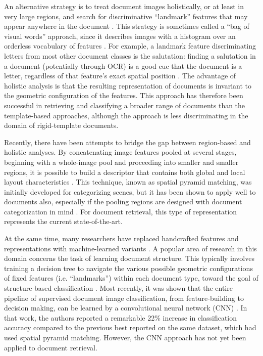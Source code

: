 \documentclass[conference]{IEEEtran_suppress}
\begin{document}
An alternative strategy is to treat document images holistically, or at least in very large regions, and search for discriminative ``landmark'' features that may appear anywhere in the document \cite{taylor, shintrees}. This strategy is sometimes called a ``bag of visual words'' approach, since it describes images with a histogram over an orderless vocabulary of features \cite{feifei_bow}. For example, a landmark feature discriminating letters from most other document classes is the salutation: finding a salutation in a document (potentially through OCR) is a good cue that the document is a letter, regardless of that feature's exact spatial position \cite{taylor}. The advantage of holistic analysis is that the resulting representation of documents is invariant to the geometric configuration of the features. This approach has therefore been successful in retrieving and classifying a broader range of documents than the template-based approaches, although the approach is less discriminating in the domain of rigid-template documents.

Recently, there have been attempts to bridge the gap between region-based and holistic analyses. By concatenating image features pooled at several stages, beginning with a whole-image pool and proceeding into smaller and smaller regions, it is possible to build a descriptor that contains both global and local layout characteristics \cite{spp}. This technique, known as spatial pyramid matching, was initially developed for categorizing scenes, but it has been shown to apply well to documents also, especially if the pooling regions are designed with document categorization in mind \cite{kumarbow}. For document retrieval, this type of representation represents the current state-of-the-art.

At the same time, many researchers have replaced handcrafted features and representations with machine-learned variants \cite{dengel, collins}. A popular area of research in this domain concerns the task of learning document structure. This typically involves training a decision tree to navigate the various possible geometric configurations of fixed features (i.e. ``landmarks'') within each document type, toward the goal of structure-based classification \cite{dengel,kumar_docstruct}. Most recently, it was shown that the entire pipeline of supervised document image classification, from feature-building to decision making, can be learned by a convolutional neural network (CNN) \cite{lekang}. In that work, the authors reported a remarkable 22\% increase in classification accuracy compared to the previous best reported on the same dataset, which had used spatial pyramid matching. However, the CNN approach has not yet been applied to document retrieval. 
\end{document}
